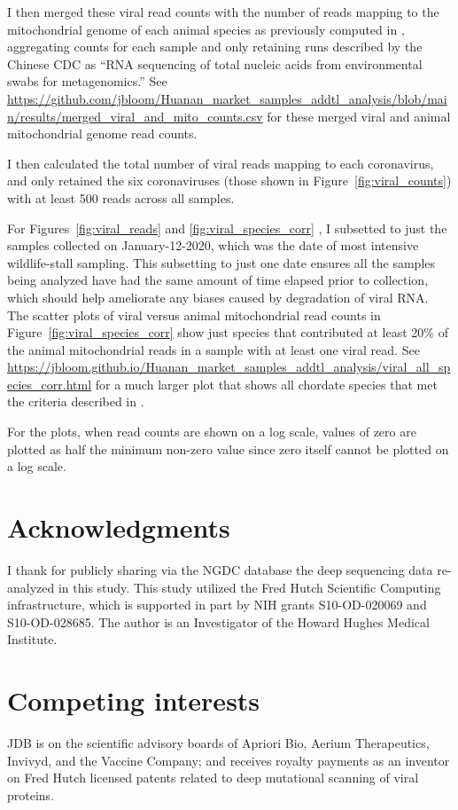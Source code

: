 \documentclass[9pt,twocolumn,twoside]{gsajnl_modified}
\begin{document}
{I then merged these viral read counts with the number of reads mapping to the mitochondrial genome of each animal species as previously computed in \citet{bloom2023association}, aggregating counts for each sample and only retaining runs described by the Chinese CDC as ``RNA sequencing of total nucleic acids from environmental swabs for metagenomics.''
See \url{https://github.com/jbloom/Huanan_market_samples_addtl_analysis/blob/main/results/merged_viral_and_mito_counts.csv} for these merged viral and animal mitochondrial genome read counts.

I then calculated the total number of viral reads mapping to each coronavirus, and only retained the six coronaviruses (those shown in Figure~\ref{fig:viral_counts}) with at least 500 reads across all samples.

For Figures~\ref{fig:viral_reads} and \ref{fig:viral_species_corr} , I subsetted to just the samples collected on January-12-2020, which was the date of most intensive wildlife-stall sampling.
This subsetting to just one date ensures all the samples being analyzed have had the same amount of time elapsed prior to collection, which should help ameliorate any biases caused by degradation of viral RNA.
The scatter plots of viral versus animal mitochondrial read counts in Figure~\ref{fig:viral_species_corr} show just species that contributed at least 20\% of the animal mitochondrial reads in a sample with at least one viral read.
See \url{https://jbloom.github.io/Huanan_market_samples_addtl_analysis/viral_all_species_corr.html} for a much larger plot that shows all chordate species that met the criteria described in \citet{bloom2023association}.

For the plots, when read counts are shown on a log scale, values of zero are plotted as half the minimum non-zero value since zero itself cannot be plotted on a log scale.

\section{Acknowledgments}
I thank \citet{liu2023surveillance} for publicly sharing via the NGDC database the deep sequencing data re-analyzed in this study.
This study utilized the Fred Hutch Scientific Computing infrastructure, which is supported in part by NIH grants S10-OD-020069 and S10-OD-028685.
The author is an Investigator of the Howard Hughes Medical Institute.

\section{Competing interests}
JDB is on the scientific advisory boards of Apriori Bio, Aerium Therapeutics, Invivyd, and the Vaccine Company; and receives royalty payments as an inventor on Fred Hutch licensed patents related to deep mutational scanning of viral proteins.


}

\onecolumn
\renewcommand{\thepage}{S\arabic{page}}
\setcounter{page}{1}
\renewcommand{\thefigure}{S\arabic{figure}}
\setcounter{figure}{0}
\renewcommand{\thetable}{S\arabic{table}}
\setcounter{table}{0}

\clearpage
\end{document}
